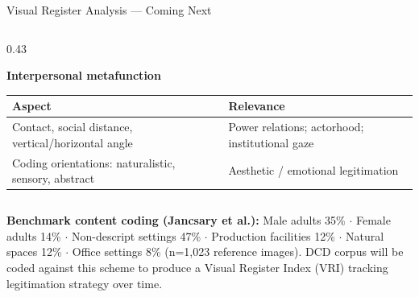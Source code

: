 \documentclass[aspectratio=169,11pt]{beamer}
\newcommand{\iconfull}[2]{\textcolor{#1}{\faIcon{#2}}}
\begin{document}
\begin{frame}{\iconfull{dcblue}{images}\enspace Visual Register Analysis — Coming Next}
\begin{columns}[T]
\begin{column}{0.43\textwidth}
{\textbf{Interpersonal metafunction}\\[0.2em]
\begin{tabular}{@{}p{1.8cm}p{2.6cm}@{}}
\toprule
\textbf{Aspect} & \textbf{Relevance} \\
\midrule
Contact, social distance, vertical/horizontal angle & Power relations; actorhood; institutional gaze \\[0.2em]
Coding orientations: naturalistic, sensory, abstract & Aesthetic / emotional legitimation \\
\bottomrule
\end{tabular}
}
\end{column}
\end{columns}
\vspace{0.4em}
{\tiny\textcolor{dcgray}{\textbf{Benchmark content coding (Jancsary et al.):}
Male adults 35\% $\cdot$ Female adults 14\% $\cdot$ Non-descript settings 47\% $\cdot$ Production facilities 12\% $\cdot$ Natural spaces 12\% $\cdot$ Office settings 8\% (n=1,023 reference images).
DCD corpus will be coded against this scheme to produce a Visual Register Index (VRI) tracking legitimation strategy over time.}}
\end{frame}
\end{document}
